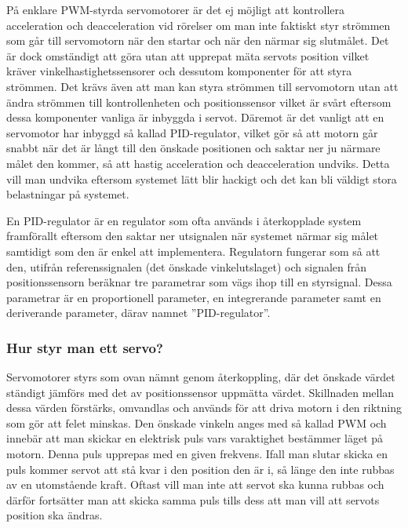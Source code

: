 \documentclass[a4paper,12pt]{article}
\begin{document}
På enklare PWM-styrda servomotorer är det ej möjligt att kontrollera acceleration och deacceleration vid rörelser om man inte faktiskt styr strömmen som går till servomotorn när den startar och när den närmar sig slutmålet. Det är dock omständigt att göra utan att upprepat mäta servots position vilket kräver vinkelhastighetssensorer och dessutom komponenter för att styra strömmen. Det krävs även att man kan styra strömmen till servomotorn utan att ändra strömmen till kontrollenheten och positionssensor vilket är svårt eftersom dessa komponenter vanliga är inbyggda i servot. Däremot är det vanligt att en servomotor har inbyggd så kallad PID-regulator, vilket gör så att motorn går snabbt när det är långt till den önskade positionen och saktar ner ju närmare målet den kommer, så att hastig acceleration och deacceleration undviks. Detta vill man undvika eftersom systemet lätt blir hackigt och det kan bli väldigt stora belastningar på systemet. 
 
En PID-regulator är en regulator som ofta används i återkopplade system framförallt eftersom den saktar ner utsignalen när systemet närmar sig målet samtidigt som den är enkel att implementera. Regulatorn fungerar som så att den, utifrån referenssignalen (det önskade vinkelutslaget) och signalen från positionssensorn beräknar tre parametrar som vägs ihop till en styrsignal. Dessa parametrar är en proportionell parameter, en integrerande parameter samt en deriverande parameter, därav namnet ”PID-regulator”. 
 
 
 
\subsubsection{Hur styr man ett servo?}
 
Servomotorer styrs som ovan nämnt genom återkoppling, där det önskade värdet ständigt  jämförs med det av positionssensor uppmätta värdet. Skillnaden mellan dessa värden förstärks, omvandlas och används för att driva motorn i den riktning som gör att felet minskas. Den önskade vinkeln anges med så kallad PWM och innebär att man skickar en elektrisk puls vars varaktighet bestämmer läget på motorn. Denna puls upprepas med en given frekvens. Ifall man slutar skicka en puls kommer servot att stå kvar i den position den är i, så länge den inte rubbas av en utomstående kraft. Oftast vill man inte att servot ska kunna rubbas och därför fortsätter man att skicka samma puls tills dess att man vill att servots position ska ändras. 
 
\end{document}
